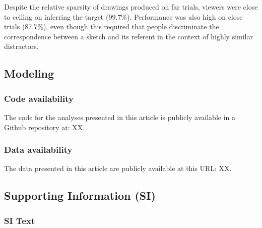 \documentclass[9pt,twocolumn,twoside]{pnas-new}
\begin{document}
Despite the relative sparsity of drawings produced on far trials, viewers were close to ceiling on inferring the target (99.7\%). Performance was also high on close trials (87.7\%), even though this required that people discriminate the correspondence between a sketch and its referent in the context of highly similar distractors. 

\subsection*{Modeling}


\subsubsection*{Code availability} The code for the analyses presented in this article is publicly available in a Github repository at: XX.

\subsubsection*{Data availability} The data presented in this article are publicly available at this URL: XX.

\subsection*{Supporting Information (SI)}


\subsubsection*{SI Text}

\end{document}

